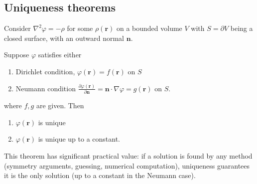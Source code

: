 \documentclass[a4paper]{article}
\begin{document}
\subsection{Uniqueness theorems}
\begin{thm}
  Consider $\nabla^2 \varphi = - \rho$ for some $\rho (\mathbf{r})$ on a bounded volume $V$ with $S = \partial V$ being a closed surface, with an outward normal $\mathbf{n}$.

  Suppose $\varphi$ satisfies either
  \begin{enumerate}
    \item Dirichlet condition, $\varphi(\mathbf{r}) = f(\mathbf{r})$ on $S$
    \item Neumann condition $\frac{\partial \varphi(\mathbf{r})}{\partial \mathbf{n}} = \mathbf{n}\cdot \nabla \varphi = g(\mathbf{r})$ on $S$.
  \end{enumerate}
  where $f, g$ are given. Then
  \begin{enumerate}
    \item $\varphi(\mathbf{r})$ is unique
    \item $\varphi(\mathbf{r})$ is unique up to a constant.
  \end{enumerate}
\end{thm}

\begin{rmk}
  This theorem has significant practical value: if a solution is found by any method (symmetry arguments, guessing, numerical computation), uniqueness guarantees it is the only solution (up to a constant in the Neumann case).
\end{rmk}
\end{document}
